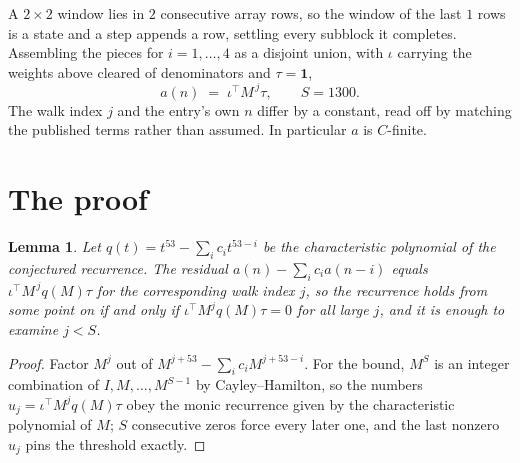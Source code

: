 \documentclass[11pt,a4paper]{article}
\theoremstyle{plain}
\newtheorem{lemma}[theorem]{Lemma}
\theoremstyle{definition}
\begin{document}
A $2\times2$ window lies in $2$ consecutive array rows, so the window of the last
$1$ rows is a state and a step appends a row, settling every subblock it completes.
Assembling the pieces for $i=1,\dots,4$ as a disjoint union, with $\iota$ carrying the
weights above cleared of denominators and $\tau=\mathbf{1}$,
\[
a(n)\;=\;\iota^{\!\top}M^{\,j}\tau ,\qquad S=1300.
\]
The walk index $j$ and the entry's own $n$ differ by a constant, read off by matching the
published terms rather than assumed. In particular $a$ is $C$-finite.

\section{The proof}

\begin{lemma}\label{lem:crit}
Let $q(t)=t^{53}-\sum_i c_it^{53-i}$ be the characteristic polynomial of the
conjectured recurrence. The residual $a(n)-\sum_ic_ia(n-i)$ equals
$\iota^{\!\top}M^{\,j}q(M)\tau$ for the corresponding walk index $j$, so the recurrence
holds from some point on if and only if $\iota^{\!\top}M^{j}q(M)\tau=0$ for all large $j$,
and it is enough to examine $j<S$.
\end{lemma}

\begin{proof}
Factor $M^{j}$ out of $M^{j+53}-\sum_ic_iM^{j+53-i}$. For the bound, $M^{S}$
is an integer combination of $I,M,\dots,M^{S-1}$ by Cayley--Hamilton, so the numbers
$u_j=\iota^{\!\top}M^{j}q(M)\tau$ obey the monic recurrence given by the characteristic
polynomial of $M$; $S$ consecutive zeros force every later one, and the last nonzero $u_j$
pins the threshold exactly.
\end{proof}
\end{document}
